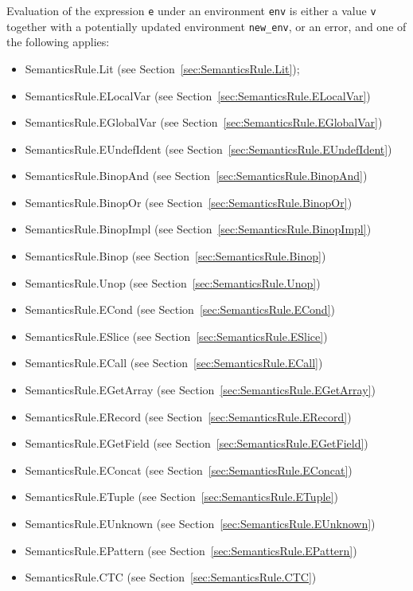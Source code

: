 \documentclass{book}
\begin{document}
Evaluation of the expression \texttt{e} under an environment \texttt{env} is
either a value \texttt{v} together with a potentially updated
environment \texttt{new\_env}, or an error, and one of the following applies:
\begin{itemize}
\item SemanticsRule.Lit (see Section~\ref{sec:SemanticsRule.Lit});
\item SemanticsRule.ELocalVar (see Section~\ref{sec:SemanticsRule.ELocalVar})
\item SemanticsRule.EGlobalVar (see Section~\ref{sec:SemanticsRule.EGlobalVar})
\item SemanticsRule.EUndefIdent (see Section~\ref{sec:SemanticsRule.EUndefIdent})
\item SemanticsRule.BinopAnd (see Section~\ref{sec:SemanticsRule.BinopAnd})
\item SemanticsRule.BinopOr (see Section~\ref{sec:SemanticsRule.BinopOr})
\item SemanticsRule.BinopImpl (see Section~\ref{sec:SemanticsRule.BinopImpl})
\item SemanticsRule.Binop (see Section~\ref{sec:SemanticsRule.Binop})
\item SemanticsRule.Unop (see Section~\ref{sec:SemanticsRule.Unop})
\item SemanticsRule.ECond (see Section~\ref{sec:SemanticsRule.ECond})
\item SemanticsRule.ESlice (see Section~\ref{sec:SemanticsRule.ESlice})
\item SemanticsRule.ECall (see Section~\ref{sec:SemanticsRule.ECall})
\item SemanticsRule.EGetArray (see Section~\ref{sec:SemanticsRule.EGetArray})
\item SemanticsRule.ERecord (see Section~\ref{sec:SemanticsRule.ERecord})
\item SemanticsRule.EGetField (see Section~\ref{sec:SemanticsRule.EGetField})
\item SemanticsRule.EConcat (see Section~\ref{sec:SemanticsRule.EConcat})
\item SemanticsRule.ETuple (see Section~\ref{sec:SemanticsRule.ETuple})
\item SemanticsRule.EUnknown (see Section~\ref{sec:SemanticsRule.EUnknown})
\item SemanticsRule.EPattern (see Section~\ref{sec:SemanticsRule.EPattern})
\item SemanticsRule.CTC (see Section~\ref{sec:SemanticsRule.CTC})
\end{itemize}
\end{document}
